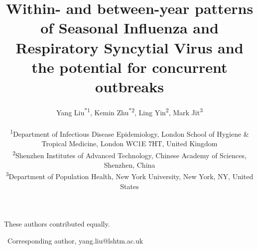 \documentclass[12pt]{article}
\date{}
\newcommand{\corenv}{\raisebox{0.2ex}{\scriptsize\Letter}}
\begin{document}
\title{Within- and between-year patterns of Seasonal Influenza and Respiratory Syncytial Virus and the potential for concurrent outbreaks}

\author{%
\begin{center}
Yang Liu\textsuperscript{*}\textsuperscript{\corenv}\textsuperscript{1}, Kemin Zhu\textsuperscript{*}\textsuperscript{2}, Ling Yin\textsuperscript{2}, Mark Jit\textsuperscript{3}\\[0.5em]
\small
\begin{minipage}{0.9\textwidth}
\centering
\textsuperscript{1}Department of Infectious Disease Epidemiology, London School of Hygiene \& Tropical Medicine, London WC1E 7HT, United Kingdom\\[0.3em]
\textsuperscript{2}Shenzhen Institutes of Advanced Technology, Chinese Academy of Sciences, Shenzhen, China\\[0.3em]
\textsuperscript{3}Department of Population Health, New York University, New York, NY, United States
\end{minipage}
\end{center}
}

\maketitle

\vspace{-0.5cm}
\begin{flushleft}
\small *These authors contributed equally.
\par\smallskip
\small \corenv\ Corresponding author, yang.liu@lshtm.ac.uk
\end{flushleft}


\vspace{0.5cm}

\linenumbers





%
%



\end{document}
